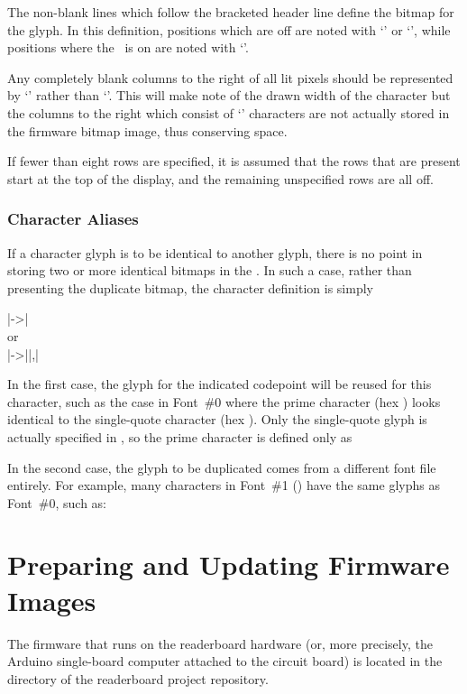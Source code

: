 The non-blank lines which follow the bracketed header line define
the bitmap for the glyph. In this definition, positions which are off
are noted with `' or `\z{|}', while positions where the \led\ is
on are noted with `'.

Any completely blank columns to the right of all lit pixels should be
represented by `\z{|}' rather than `'. This will make note of the drawn
width of the character but the columns to the right which consist of `\z{|}'
characters are not actually stored in the firmware bitmap image, thus conserving
 space.

If fewer than eight rows are specified, it is assumed that the rows that are present
start at the top of the display, and the remaining unspecified rows are all off.

\subsection{Character Aliases}
If a character glyph is to be identical to another glyph, there is no point
in storing two or more identical bitmaps in the . In such a case,
rather than presenting the duplicate bitmap, the character definition
is simply
\begin{center}
	\begin{Coding}
		|->|\\
		or\\
		|->||,|
	\end{Coding}
\end{center}
In the first case, the glyph for the indicated codepoint will be reused for this character,
such as the case in Font~\#0 where the prime character (hex ) looks identical to
the single-quote character (hex ). Only the single-quote glyph is actually specified
in , so the prime character is defined only as

In the second case, the glyph to be duplicated comes from a different font file entirely.
For example, many characters in Font~\#1 () have the same glyphs
as Font~\#0, such as:

\chapter{Preparing and Updating Firmware Images}\label{chap:firmware}
The firmware that runs on the readerboard hardware (or, more precisely, the Arduino single-board
computer attached to the circuit board) is located in the  directory of the
readerboard project repository.

